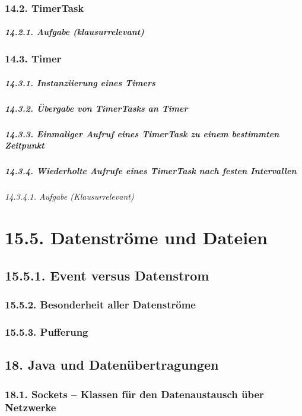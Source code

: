 \subsection{14.2.	TimerTask}
\paragraph{14.2.1.	Aufgabe (klausurrelevant)}
\subsection{14.3.	Timer}
\paragraph{14.3.1.	Instanziierung eines Timers}
\paragraph{14.3.2.	Übergabe von TimerTasks an Timer}
\paragraph{14.3.3.	Einmaliger Aufruf eines TimerTask zu einem bestimmten Zeitpunkt}
\paragraph{14.3.4.	Wiederholte Aufrufe eines TimerTask nach festen Intervallen}
\subparagraph{14.3.4.1.	Aufgabe (Klausurrelevant)}

\chapter{15.5.	Datenströme und Dateien}
\section{15.5.1.	Event versus Datenstrom}
\subsection{15.5.2.	Besonderheit aller Datenströme}
\subsection{15.5.3.	Pufferung}
\section{18.	Java und Datenübertragungen}
\subsection{18.1.	Sockets – Klassen für den Datenaustausch über Netzwerke}
